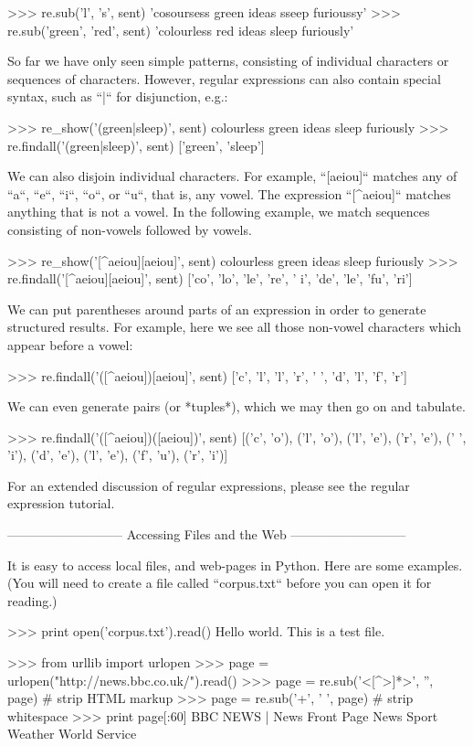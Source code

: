 \documentclass[presentation]{beamer}
\begin{document}
  >>> re.sub('l', 's', sent)
  'cosoursess green ideas sseep furioussy'
  >>> re.sub('green', 'red', sent)
  'colourless red ideas sleep furiously'

So far we have only seen simple patterns, consisting of individual
characters or sequences of characters.  However, regular expressions can
also contain special syntax, such as ``|`` for disjunction, e.g.:

  >>> re_show('(green|sleep)', sent)
  colourless {green} ideas {sleep} furiously
  >>> re.findall('(green|sleep)', sent)
  ['green', 'sleep']

We can also disjoin individual characters.  For example,
``[aeiou]`` matches any of ``a``, ``e``, ``i``, ``o``, or ``u``,
that is, any vowel.  The expression ``[^aeiou]`` matches anything
that is not a vowel.  In the following example, we match sequences
consisting of non-vowels followed by vowels.

  >>> re_show('[^aeiou][aeiou]', sent)
  {co}{lo}ur{le}ss g{re}en{ i}{de}as s{le}ep {fu}{ri}ously
  >>> re.findall('[^aeiou][aeiou]', sent)
  ['co', 'lo', 'le', 're', ' i', 'de', 'le', 'fu', 'ri']

We can put parentheses around parts of an expression in order to
generate structured results.  For example, here we see all those
non-vowel characters which appear before a vowel:

  >>> re.findall('([^aeiou])[aeiou]', sent)
  ['c', 'l', 'l', 'r', ' ', 'd', 'l', 'f', 'r']

We can even generate pairs (or *tuples*), which we may then go
on and tabulate.

  >>> re.findall('([^aeiou])([aeiou])', sent)
  [('c', 'o'), ('l', 'o'), ('l', 'e'), ('r', 'e'), (' ', 'i'), ('d', 'e'), ('l', 'e'), ('f', 'u'), ('r', 'i')]

For an extended discussion of regular expressions, please see the
regular expression tutorial.

---------------------------
Accessing Files and the Web
---------------------------

It is easy to access local files, and web-pages in Python.  Here are some
examples.  (You will need to create a file called ``corpus.txt``
before you can open it for reading.)

  >>> print open('corpus.txt').read() 
  Hello world.  This is a test file.

  >>> from urllib import urlopen
  >>> page = urlopen("http://news.bbc.co.uk/").read()
  >>> page = re.sub('<[^>]*>', '', page)   # strip HTML markup
  >>> page = re.sub('\s+', ' ', page)      # strip whitespace
  >>> print page[:60]
   BBC NEWS | News Front Page News Sport Weather World Service
\end{document}
